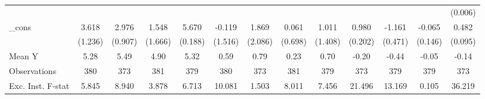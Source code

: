 {\begin{tabular}{l*{12}{c}}
            &                     &                     &                     &                     &                     &                     &                     &                     &                     &                     &                     &     (0.006)         \\
\addlinespace
\_cons      &       3.618\sym{***}&       2.976\sym{***}&       1.548         &       5.670\sym{***}&      -0.119         &       1.869         &       0.061         &       1.011         &       0.980\sym{***}&      -1.161\sym{**} &      -0.065         &       0.482\sym{***}\\
            &     (1.236)         &     (0.907)         &     (1.666)         &     (0.188)         &     (1.516)         &     (2.086)         &     (0.698)         &     (1.408)         &     (0.202)         &     (0.471)         &     (0.146)         &     (0.095)         \\
\midrule
Mean Y      &        5.28         &        5.49         &        4.90         &        5.32         &        0.59         &        0.79         &        0.23         &        0.70         &       -0.20         &       -0.44         &       -0.05         &       -0.14         \\
Observations&         380         &         373         &         381         &         379         &         380         &         373         &         381         &         379         &         373         &         379         &         379         &         373         \\
Exc. Inst. F-stat&       5.845         &       8.940         &       3.878         &       6.713         &      10.081         &       1.503         &       8.011         &       7.456         &      21.496         &      13.169         &       0.105         &      36.219         \\
\bottomrule
\end{tabular}
}
